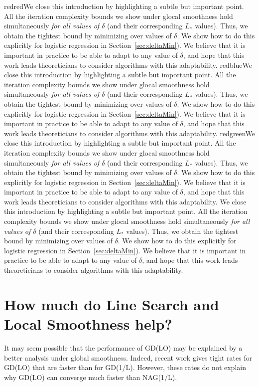 \documentclass[10pt]{article} %
\newif\ifshowcolours
\def\red{red}
\def\blue{blue}
\def\green{green}
\renewcommand{\textcolor}[2]{%
  \ifshowcolours
    {\color{#1}#2}%
  \else
    \def\temp{#1}%
    \ifx\temp\red     #2\else
    \ifx\temp\blue    #2\else
    \ifx\temp\green   #2\else
        {\color{#1}#2}%
    \fi\fi\fi
  \fi
}
\begin{document}
\textcolor{red}{We close this introduction by highlighting a subtle but important point. All the iteration complexity bounds we show under glocal smoothness hold simultaneously \emph{for all values of $\delta$} (and their corresponding $L_*$ values). Thus, we obtain the tightest bound by minimizing over values of $\delta$. We show how to do this explicitly for logistic regression in Section~\ref{sec:deltaMin}). We believe that it is important in practice to be able to adapt to any value of $\delta$, and hope that this work leads theoreticians to consider algorithms with this adaptability.}


\section{How much do Line Search and Local Smoothness help?\nopunct}
\label{Background}
It may seem possible that the performance of GD(LO) may be explained by a better analysis under global smoothness. Indeed, recent work \cite{KlerkGT17} gives tight rates for GD(LO) that are faster than for GD(1/L). However, these rates do not explain why GD(LO) can converge much faster than NAG(1/L).
\end{document}
